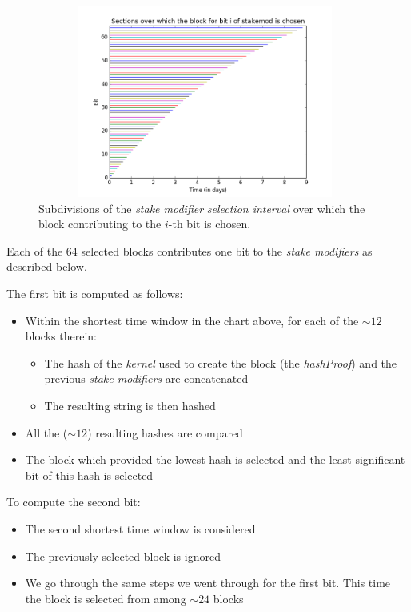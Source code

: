 \documentclass[a4paper,11pt]{article}
\begin{document}
\begin{figure}[H]
\centering
\includegraphics[width=110mm,height=63mm]{03_ppc_sections.png}
\caption{Subdivisions of the \textit{stake modifier} \textit{selection interval} over which the block contributing to the $i$-th bit is chosen.}
\end{figure}

\newpage
Each of the 64 selected blocks contributes one bit to the \textit{stake modifiers} as described below.

The first bit is computed as follows:
\begin{itemize}
\setlength{\itemsep}{0pt}
\item{Within the shortest time window in the chart above, for each of the $\sim12$ blocks therein:}
\begin{itemize}
\setlength{\itemsep}{0pt}
\item{The hash of the \textit{kernel} used to create the block (the \textit{hashProof}) and the previous \textit{stake modifiers} are concatenated}
\item{The resulting string is then hashed}
\end{itemize}
\item{All the ($\sim12$) resulting hashes are compared}
\item{The block which provided the lowest hash is selected and the least significant bit of this hash is selected}
\end{itemize}

To compute the second bit:
\begin{itemize}
\setlength{\itemsep}{0pt}
\item{The second shortest time window is considered}
\item{The previously selected block is ignored}
\item{We go through the same steps we went through for the first bit. This time the block is selected from among $\sim24$ blocks }
\end{itemize}
\end{document}
